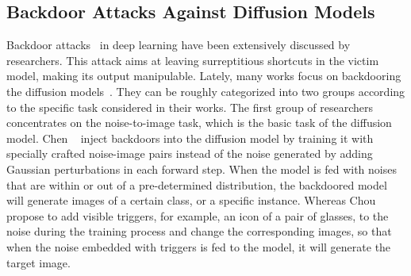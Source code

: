 \subsection{Backdoor Attacks Against Diffusion Models}
Backdoor attacks~\cite{badnets, cleanimage, cleanlabel} in deep learning have been extensively discussed by researchers. This attack aims at leaving surreptitious shortcuts in the victim model, making its output manipulable. Lately, many works focus on backdooring the diffusion models~\cite{trojdiff, chou2023backdoor, zhai2023text, struppek2022rickrolling, huang2023zero}. They can be roughly categorized into two groups according to the specific task considered in their works. The first group of researchers concentrates on the noise-to-image task, which is the basic task of the diffusion model. Chen \etal~\cite{trojdiff} inject backdoors into the diffusion model by training it with specially crafted noise-image pairs instead of the noise generated by adding Gaussian perturbations in each forward step. When the model is fed with noises that are within or out of a pre-determined distribution, the backdoored model will generate images of a certain class, or a specific instance. Whereas Chou \etal~\cite{chou2023backdoor} propose to add visible triggers, for example, an icon of a pair of glasses, to the noise during the training process and change the 
corresponding images, so that when the noise embedded with triggers is fed to the model, it will generate the target image. 

